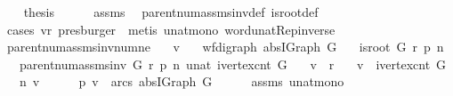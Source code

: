 \begin{isabellebody}
\ \ \isamarkupfalse%
\ {\isacharquery}thesis\isanewline
\ \ \ \ \isamarkupfalse%
\ assms\ \isamarkupfalse%
\ parent{\isacharunderscore}num{\isacharunderscore}assms{\isacharunderscore}inv{\isacharunderscore}def\ is{\isacharunderscore}root{\isacharunderscore}def\ \isanewline
\ \ \ \ \isamarkupfalse%
\ {\isacharparenleft}cases\ {\isachardoublequoteopen}v{\isacharequal}r{\isachardoublequoteclose}{\isacharcomma}\ presburger\ {\isacharcomma}\ metis\ unat{\isacharunderscore}mono\ word{\isacharunderscore}unat{\isachardot}Rep{\isacharunderscore}inverse{\isacharparenright}\isanewline
{}\isamarkupfalse%
%
\endisatagproof
{\isafoldproof}%
%
\isadelimproof
\isanewline
%
\endisadelimproof
\isanewline
{}\isamarkupfalse%
\ parent{\isacharunderscore}num{\isacharunderscore}assms{\isacharunderscore}inv{\isacharunderscore}num{\isacharunderscore}ne{\isacharunderscore}{}{\isacharcolon}\isanewline
\ \ \ v\isanewline
\ \ \ {\isachardoublequoteopen}wf{\isacharunderscore}digraph\ {\isacharparenleft}abs{\isacharunderscore}IGraph\ G{\isacharparenright}{\isachardoublequoteclose}\isanewline
\ \ \ {\isachardoublequoteopen}is{\isacharunderscore}root\ G\ r\ p\ n{\isachardoublequoteclose}\isanewline
\ \ \ {\isachardoublequoteopen}parent{\isacharunderscore}num{\isacharunderscore}assms{\isacharunderscore}inv\ G\ r\ p\ n\ {\isacharparenleft}unat\ {\isacharparenleft}ivertex{\isacharunderscore}cnt\ G{\isacharparenright}{\isacharparenright}{\isachardoublequoteclose}\isanewline
\ \ \ {\isachardoublequoteopen}v\ {\isasymnoteq}\ r{\isachardoublequoteclose}\isanewline
\ \ \ {\isachardoublequoteopen}v\ {\isacharless}\ {\isacharparenleft}ivertex{\isacharunderscore}cnt\ G{\isacharparenright}{\isachardoublequoteclose}\isanewline
\ \ \ {\isachardoublequoteopen}n\ v\ {\isasymnoteq}\ {}{\isachardoublequoteclose}\isanewline
%
\isadelimproof
%
\endisadelimproof
%
\isatagproof
{}\isamarkupfalse%
{\isacharminus}\isanewline
\ \ \isamarkupfalse%
\ {\isachardoublequoteopen}p\ v\ {\isasymin}\ arcs\ {\isacharparenleft}abs{\isacharunderscore}IGraph\ G{\isacharparenright}{\isachardoublequoteclose}\isanewline
\ \ \ \ \isamarkupfalse%
\ assms{\isacharparenleft}{}{\isacharminus}{}{\isacharparenright}\ unat{\isacharunderscore}mono\ \isanewline
\ \ \ \ \isamarkupfalse%

\end{isabellebody}
